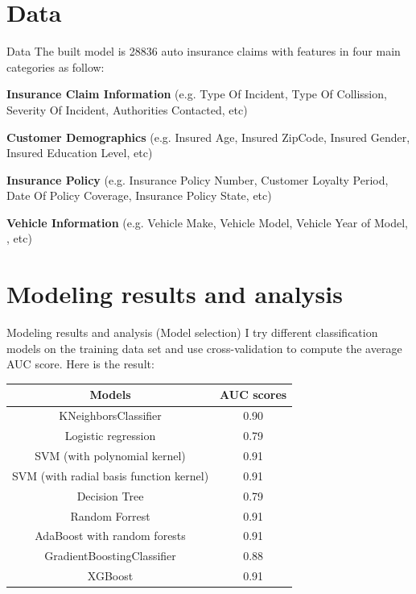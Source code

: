 \documentclass[aspectratio=169,xcolor=dvipsnames]{beamer}
\begin{document}
\section{Data}

\begin{frame}{Data}
The built model is 28836 auto insurance claims with features in four main categories as follow: 

\text{ }

\textbf{Insurance Claim Information} (e.g. Type Of Incident, Type Of Collission, Severity Of Incident, Authorities Contacted, etc) 

\text{ }

\textbf{Customer Demographics} (e.g. Insured Age, Insured ZipCode, Insured Gender, Insured Education Level, etc)

\text{ }

\textbf{Insurance Policy} (e.g. Insurance Policy Number, Customer Loyalty Period, Date Of Policy Coverage, Insurance Policy State, etc)

\text{ }

\textbf{Vehicle Information} (e.g. Vehicle Make, Vehicle Model, Vehicle Year of Model, , etc)


  
   
\end{frame}

\section{Modeling results and analysis}

\begin{frame}{Modeling results and analysis (Model selection)}
I try different classification models on the training data set and use cross-validation to compute the average AUC score. Here is the result: 

\begin{center}
\begin{tabular}{||c c||} 
 \hline
 Models & AUC scores\\ [0.5ex] 
 \hline\hline
 KNeighborsClassifier & 0.90 \\ 
 \hline
 Logistic regression & 0.79 \\
 \hline
 SVM (with polynomial kernel) & 0.91 \\
 \hline
 SVM (with radial basis function kernel) & 0.91 \\
 \hline
 Decision Tree & 0.79\\
 \hline
 Random Forrest & 0.91 \\ 
 \hline
 AdaBoost with random forests & 0.91\\
 \hline
 GradientBoostingClassifier & 0.88\\
 \hline
 XGBoost & 0.91\\
 \hline
\end{tabular}
\end{center}

\end{frame}
\end{document}
